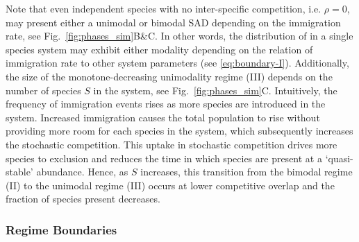 \documentclass[9pt,twocolumn,twoside,lineno]{pnas-new}
\begin{document}
Note that even independent species with no inter-specific competition, i.e. $\rho=0$, may present either a unimodal or bimodal SAD depending on the immigration rate, see Fig.~\ref{fig:phases_sim}B\&C.
In other words, the distribution of in a single species system may exhibit either modality depending on the relation of immigration rate to other system parameters (see \eqref{eq:boundary-I}).
Additionally, the size of the monotone-decreasing unimodality regime (III) depends on the number of species $S$ in the system, see Fig.~\ref{fig:phases_sim}C.
Intuitively, the frequency of immigration events rises as more species are introduced in the system.
Increased immigration causes the total population to rise without providing more room for each species in the system, which subsequently increases the stochastic competition.
This uptake in stochastic competition drives more species to exclusion and reduces the time in which species are present at a `quasi-stable' abundance.
Hence, as $S$ increases, this transition from the bimodal regime (II) to  the unimodal regime (III) occurs at lower competitive overlap and the fraction of species present decreases.


\subsubsection{Regime Boundaries}
\label{sec:regime-bound}
\end{document}
